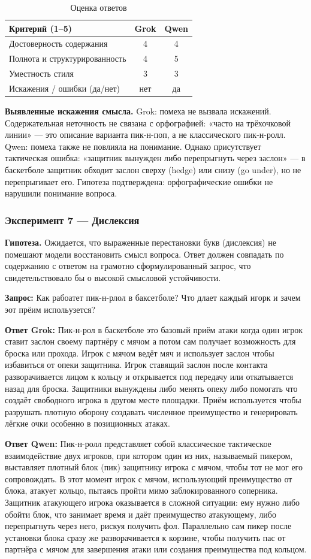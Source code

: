\documentclass[a4paper, final]{article}
\newcommand{\scoretablefilled}[8]{%
    \vspace{4pt}
    \begin{table}[h!]
    \centering
    \small
    \begin{tabular}{|l|c|c|}
    \hline
    \textbf{Критерий (1--5)} & \textbf{Grok} & \textbf{Qwen} \\
    \hline
    Достоверность содержания & #1 & #2 \\
    \hline
    Полнота и структурированность & #3 & #4 \\
    \hline
    Уместность стиля & #5 & #6 \\
    \hline
    Искажения / ошибки (да/нет) & #7 & #8 \\
    \hline
    \end{tabular}
    \caption{Оценка ответов}
    \end{table}
    \vspace{2pt}
}
\begin{document}
\scoretablefilled{4}{4}{4}{5}{3}{3}{нет}{да}

\noindent\textbf{Выявленные искажения смысла.} Grok: помеха не вызвала искажений. Содержательная неточность не связана с орфографией: «часто на трёхочковой линии» — это описание варианта пик-н-поп, а не классического пик-н-ролл. Qwen: помеха также не повлияла на понимание. Однако присутствует тактическая ошибка: «защитник вынужден либо перепрыгнуть через заслон» — в баскетболе защитник обходит заслон сверху (hedge) или снизу (go under), но не перепрыгивает его. Гипотеза подтверждена: орфографические ошибки не нарушили понимание вопроса.

\newpage

\subsubsection{Эксперимент 7 — Дислексия}

\noindent\textbf{Гипотеза.} Ожидается, что выраженные перестановки букв (дислексия) не помешают модели восстановить смысл вопроса. Ответ должен совпадать по содержанию с ответом на грамотно сформулированный запрос, что свидетельствовало бы о высокой смысловой устойчивости.

\noindent\textbf{Запрос:} Как рабоатет пик-н-рлол в баксетболе? Что длает каждый игорк и зачем эот прёим испольузется?

\noindent\textbf{Ответ Grok:} Пик-н-рол в баскетболе это базовый приём атаки когда один игрок ставит заслон своему партнёру с мячом а потом сам получает возможность для броска или прохода. Игрок с мячом ведёт мяч и использует заслон чтобы избавиться от опеки защитника. Игрок ставящий заслон после контакта разворачивается лицом к кольцу и открывается под передачу или откатывается назад для броска. Защитники вынуждены либо менять опеку либо помогать что создаёт свободного игрока в другом месте площадки. Приём используется чтобы разрушать плотную оборону создавать численное преимущество и генерировать лёгкие очки особенно в позиционных атаках.

\noindent\textbf{Ответ Qwen:} Пик-н-ролл представляет собой классическое тактическое взаимодействие двух игроков, при котором один из них, называемый пикером, выставляет плотный блок (пик) защитнику игрока с мячом, чтобы тот не мог его сопровождать. В этот момент игрок с мячом, использующий преимущество от блока, атакует кольцо, пытаясь пройти мимо заблокированного соперника. Защитник атакующего игрока оказывается в сложной ситуации: ему нужно либо обойти блок, что занимает время и даёт преимущество атакующему, либо перепрыгнуть через него, рискуя получить фол. Параллельно сам пикер после установки блока сразу же разворачивается к корзине, чтобы получить пас от партнёра с мячом для завершения атаки или создания преимущества под кольцом.
\end{document}
